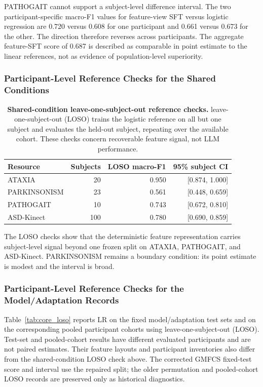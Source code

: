 PATHOGAIT cannot support a subject-level difference interval. The two participant-specific macro-F1 values for feature-view SFT versus logistic regression are 0.720 versus 0.608 for one participant and 0.661 versus 0.673 for the other. The direction therefore reverses across participants. The aggregate feature-SFT score of 0.687 is described as comparable in point estimate to the linear references, not as evidence of population-level superiority.

\subsubsection{Participant-Level Reference Checks for the Shared Conditions}
\label{sec:supp_standardized_loso}

\begin{table}[H]
\centering
\caption{\textbf{Shared-condition leave-one-subject-out reference checks.} leave-one-subject-out (LOSO) trains the logistic reference on all but one subject and evaluates the held-out subject, repeating over the available cohort. These checks concern recoverable feature signal, not LLM performance.}
\label{tab:standardized_loso}
\small
\begin{tabular}{lrrr}
\toprule
Resource & Subjects & LOSO macro-F1 & 95\% subject CI \\
\midrule
ATAXIA & 20 & 0.950 & [0.874, 1.000] \\
PARKINSONISM & 23 & 0.561 & [0.448, 0.659] \\
PATHOGAIT & 10 & 0.743 & [0.672, 0.810] \\
ASD-Kinect & 100 & 0.780 & [0.690, 0.859] \\
\bottomrule
\end{tabular}
\end{table}

The LOSO checks show that the deterministic feature representation carries subject-level signal beyond one frozen split on ATAXIA, PATHOGAIT, and ASD-Kinect. PARKINSONISM remains a boundary condition: its point estimate is modest and the interval is broad.


\subsubsection{Participant-Level Reference Checks for the Model/Adaptation Records}
\label{sec:supp_core_loso}

Table~\ref{tab:core_loso} reports LR on the fixed model/adaptation test sets and on the corresponding pooled participant cohorts using leave-one-subject-out (LOSO). Test-set and pooled-cohort results have different evaluated participants and are not paired estimates. Their feature layouts and participant inventories also differ from the shared-condition LOSO check above. The corrected GMFCS fixed-test score and interval use the repaired split; the older permutation and pooled-cohort LOSO records are preserved only as historical diagnostics.

